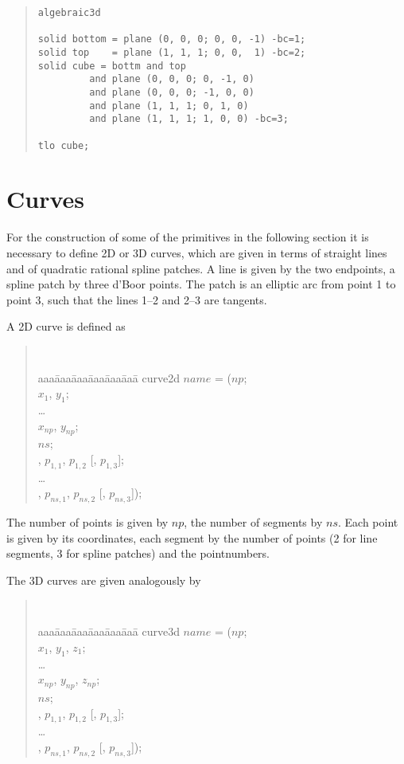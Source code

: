 \documentclass[12pt]{book}
\begin{document}
\begin{quote}
\begin{verbatim}
algebraic3d

solid bottom = plane (0, 0, 0; 0, 0, -1) -bc=1;
solid top    = plane (1, 1, 1; 0, 0,  1) -bc=2;
solid cube = bottm and top 
         and plane (0, 0, 0; 0, -1, 0)
         and plane (0, 0, 0; -1, 0, 0)
         and plane (1, 1, 1; 0, 1, 0)
         and plane (1, 1, 1; 1, 0, 0) -bc=3;

tlo cube;
\end{verbatim}
\end{quote}



\section{Curves}
For the construction of some of the primitives in the following section it is necessary to define 2D or
3D curves, which are given in terms of straight lines and of quadratic rational spline patches. A line is given
by the two endpoints, a spline patch by three d'Boor points. The patch is an elliptic arc from point 1 to point 3,
such that the lines 1--2 and 2--3 are tangents.

A 2D curve is defined as
\begin{quote}
\samepage
\tt
\begin{tabbing}
aaa\=aaa\=aaa\=aaa\=aaa\=aaa\= \kill
curve2d $name$ = ($np$;\\
\>\> $x_1$, $y_1$;\\
\>\> \ldots\\
\>\> $x_{np}$, $y_{np}$;\\
\>\> $ns$;\\
\>\> [ 2 | 3 ], $p_{1,1}$, $p_{1,2}$ [, $p_{1,3}$];\\ 
\>\> \ldots\\
\>\> [ 2 | 3 ], $p_{ns,1}$, $p_{ns,2}$ [, $p_{ns,3}$]); 
\end{tabbing}
\end{quote}
The number of points is given by $np$, the number of segments by $ns$. Each point is
given by its coordinates, each segment by the number of points 
(2 for line segments, 3 for spline patches) and the pointnumbers.

The 3D curves are given analogously by
\begin{quote}
\samepage
\tt
\begin{tabbing}
aaa\=aaa\=aaa\=aaa\=aaa\=aaa\= \kill
curve3d $name$ = ($np$;\\
\>\> $x_1$, $y_1$, $z_1$;\\
\>\> \ldots\\
\>\> $x_{np}$, $y_{np}$, $z_{np}$;\\
\>\> $ns$;\\
\>\> [ 2 | 3 ], $p_{1,1}$, $p_{1,2}$ [, $p_{1,3}$];\\ 
\>\> \ldots\\
\>\> [ 2 | 3 ], $p_{ns,1}$, $p_{ns,2}$ [, $p_{ns,3}$]); 
\end{tabbing}
\end{quote}
\end{document}
